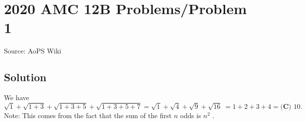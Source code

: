 \documentclass[12pt]{article}
\begin{document}
\section*{{2020 AMC 12B Problems/Problem 1}}
Source: AoPS Wiki

\subsection*{Solution}
We have \[\sqrt{1} + \sqrt{1+3} + \sqrt{1+3+5} + \sqrt{1+3+5+7} = \sqrt{1} + \sqrt{4} + \sqrt{9} + \sqrt{16}\ = 1 + 2 + 3 + 4 = \boxed{\textbf{(C) } 10}.\] Note: This comes from the fact that the sum of the first $n$ odds is $n^2$ .
\end{document}
